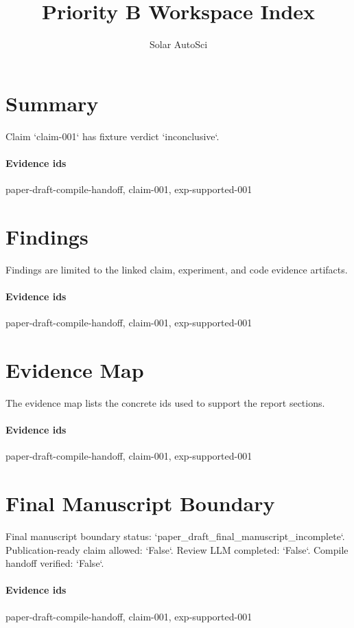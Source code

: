 \documentclass{article}
\title{Priority B Workspace Index}
\author{Solar AutoSci}
\date{}
\begin{document}
\maketitle

\section{Summary}
Claim `claim-001` has fixture verdict `inconclusive`.

\paragraph{Evidence ids} paper-draft-compile-handoff, claim-001, exp-supported-001

\section{Findings}
Findings are limited to the linked claim, experiment, and code evidence artifacts.

\paragraph{Evidence ids} paper-draft-compile-handoff, claim-001, exp-supported-001

\section{Evidence Map}
The evidence map lists the concrete ids used to support the report sections.

\paragraph{Evidence ids} paper-draft-compile-handoff, claim-001, exp-supported-001

\section{Final Manuscript Boundary}
Final manuscript boundary status: `paper\_draft\_final\_manuscript\_incomplete`. Publication-ready claim allowed: `False`. Review LLM completed: `False`. Compile handoff verified: `False`.

\paragraph{Evidence ids} paper-draft-compile-handoff, claim-001, exp-supported-001
\end{document}

